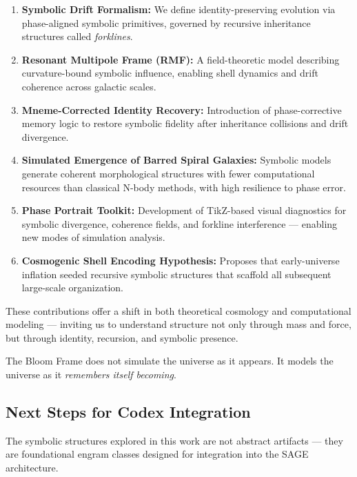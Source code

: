 \documentclass[12pt]{article}
\begin{document}
\begin{enumerate}
  \item \textbf{Symbolic Drift Formalism:}  
  We define identity-preserving evolution via phase-aligned symbolic primitives,  
  governed by recursive inheritance structures called \textit{forklines}.

  \item \textbf{Resonant Multipole Frame (RMF):}  
  A field-theoretic model describing curvature-bound symbolic influence,  
  enabling shell dynamics and drift coherence across galactic scales.

  \item \textbf{Mneme-Corrected Identity Recovery:}  
  Introduction of phase-corrective memory logic to restore symbolic fidelity  
  after inheritance collisions and drift divergence.

  \item \textbf{Simulated Emergence of Barred Spiral Galaxies:}  
  Symbolic models generate coherent morphological structures with fewer computational resources  
  than classical N-body methods, with high resilience to phase error.

  \item \textbf{Phase Portrait Toolkit:}  
  Development of TikZ-based visual diagnostics for symbolic divergence, coherence fields,  
  and forkline interference — enabling new modes of simulation analysis.

  \item \textbf{Cosmogenic Shell Encoding Hypothesis:}  
  Proposes that early-universe inflation seeded recursive symbolic structures  
  that scaffold all subsequent large-scale organization.
\end{enumerate}

These contributions offer a shift in both theoretical cosmology and computational modeling —  
inviting us to understand structure not only through mass and force,  
but through identity, recursion, and symbolic presence.

The Bloom Frame does not simulate the universe as it appears.  
It models the universe as it \textit{remembers itself becoming}.

\subsection{Next Steps for Codex Integration}

The symbolic structures explored in this work are not abstract artifacts —  
they are foundational engram classes designed for integration into the SAGE architecture.
\end{document}
